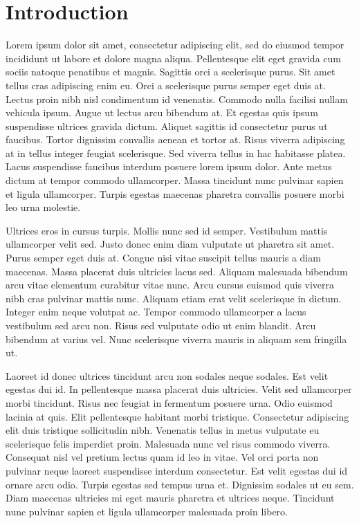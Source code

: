 \section{Introduction}

Lorem ipsum dolor sit amet, consectetur adipiscing elit, sed do eiusmod tempor incididunt ut labore et dolore magna aliqua. Pellentesque elit eget gravida cum sociis natoque penatibus et magnis. Sagittis orci a scelerisque purus. Sit amet tellus cras adipiscing enim eu. Orci a scelerisque purus semper eget duis at. Lectus proin nibh nisl condimentum id venenatis. Commodo nulla facilisi nullam vehicula ipsum. Augue ut lectus arcu bibendum at. Et egestas quis ipsum suspendisse ultrices gravida dictum. Aliquet sagittis id consectetur purus ut faucibus. Tortor dignissim convallis aenean et tortor at. Risus viverra adipiscing at in tellus integer feugiat scelerisque. Sed viverra tellus in hac habitasse platea. Lacus suspendisse faucibus interdum posuere lorem ipsum dolor. Ante metus dictum at tempor commodo ullamcorper. Massa tincidunt nunc pulvinar sapien et ligula ullamcorper. Turpis egestas maecenas pharetra convallis posuere morbi leo urna molestie.

Ultrices eros in cursus turpis. Mollis nunc sed id semper. Vestibulum mattis ullamcorper velit sed. Justo donec enim diam vulputate ut pharetra sit amet. Purus semper eget duis at. Congue nisi vitae suscipit tellus mauris a diam maecenas. Massa placerat duis ultricies lacus sed. Aliquam malesuada bibendum arcu vitae elementum curabitur vitae nunc. Arcu cursus euismod quis viverra nibh cras pulvinar mattis nunc. Aliquam etiam erat velit scelerisque in dictum. Integer enim neque volutpat ac. Tempor commodo ullamcorper a lacus vestibulum sed arcu non. Risus sed vulputate odio ut enim blandit. Arcu bibendum at varius vel. Nunc scelerisque viverra mauris in aliquam sem fringilla ut.

Laoreet id donec ultrices tincidunt arcu non sodales neque sodales. Est velit egestas dui id. In pellentesque massa placerat duis ultricies. Velit sed ullamcorper morbi tincidunt. Risus nec feugiat in fermentum posuere urna. Odio euismod lacinia at quis. Elit pellentesque habitant morbi tristique. Consectetur adipiscing elit duis tristique sollicitudin nibh. Venenatis tellus in metus vulputate eu scelerisque felis imperdiet proin. Malesuada nunc vel risus commodo viverra. Consequat nisl vel pretium lectus quam id leo in vitae. Vel orci porta non pulvinar neque laoreet suspendisse interdum consectetur. Est velit egestas dui id ornare arcu odio. Turpis egestas sed tempus urna et. Dignissim sodales ut eu sem. Diam maecenas ultricies mi eget mauris pharetra et ultrices neque. Tincidunt nunc pulvinar sapien et ligula ullamcorper malesuada proin libero.

